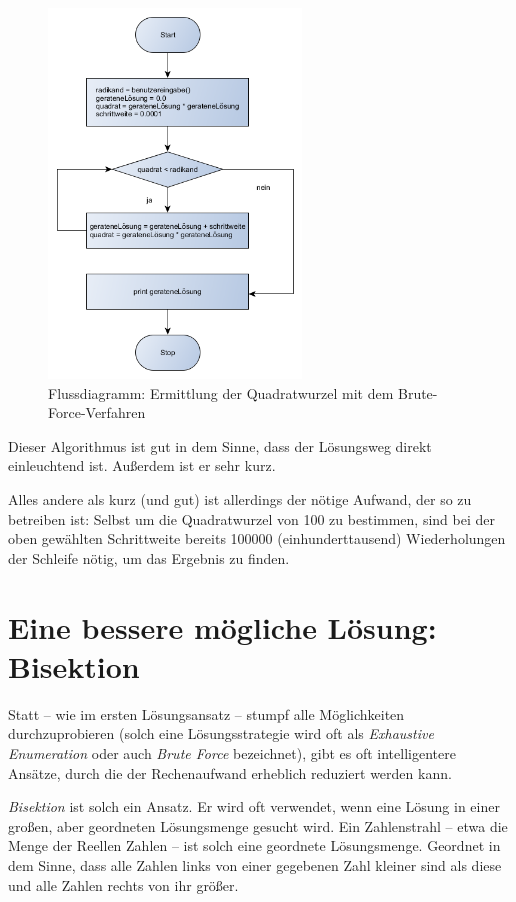 \begin{figure}[h]
  \centering
   \includegraphics[width=0.6\textwidth]{./inf/SEKII/03_Informatik/Flussdiagramm_Wurzel_Brute-Force.png}
   \caption{Flussdiagramm: Ermittlung der Quadratwurzel mit dem
   Brute-Force-Verfahren}
   \label{fig:flussdiagramm-wurzel-brute-force}
\end{figure}

Dieser Algorithmus ist gut in dem Sinne, dass der Lösungsweg direkt einleuchtend
ist. Außerdem ist er sehr kurz.

Alles andere als kurz (und gut) ist allerdings der nötige Aufwand, der so zu
betreiben ist: Selbst um die Quadratwurzel von 100 zu bestimmen, sind bei
der oben gewählten Schrittweite bereits 100000 (einhunderttausend)
Wiederholungen der Schleife nötig, um das Ergebnis zu finden.


\section{Eine bessere mögliche Lösung: Bisektion}

Statt -- wie im ersten Lösungsansatz -- stumpf alle Möglichkeiten
durchzuprobieren (solch eine Lösungsstrategie wird oft als \emph{Exhaustive
Enumeration} oder auch \emph{Brute Force} bezeichnet), gibt es oft
intelligentere Ansätze, durch die der Rechenaufwand erheblich reduziert werden
kann.

\emph{Bisektion} ist solch ein Ansatz. Er wird oft verwendet, wenn eine Lösung
in einer großen, aber geordneten Lösungsmenge gesucht wird. Ein Zahlenstrahl --
etwa die Menge der Reellen Zahlen -- ist solch eine geordnete Lösungsmenge.
Geordnet in dem Sinne, dass alle Zahlen links von einer gegebenen Zahl kleiner
sind als diese und alle Zahlen rechts von ihr größer.

